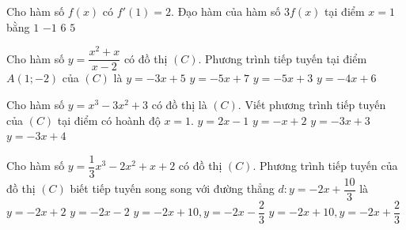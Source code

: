 \begin{ex}%
	Cho hàm số $f(x)$ có $f'(1)=2$. Đạo hàm của hàm số $3 f(x)$  tại điểm $x=1$ bằng
	\choice 
		{$1$} 
		 {$-1$}
		 {\True $6$}
		{$5$} 
\end{ex}

\begin{ex}%
	Cho hàm số $y =\dfrac{x^2 + x}{x - 2}$ có đồ thị $(C)$. Phương trình tiếp tuyến tại điểm $A(1; -2)$ của $(C)$  là
	\choice 
		{$y = -3x + 5$} 
		{$y  = -5x + 7$}
		{\True $y  = -5x + 3$}
		{$y = -4x  + 6$}
\end{ex}

\begin{ex}%
	Cho hàm số $y=x^3-3x^2+3$ có đồ thị là $(C)$. Viết phương  trình tiếp tuyến của $(C)$ tại điểm có hoành độ $x=1$.
	\choice 
		 {$y=2x-1$}
		{$y=-x+2$} 
		 {$y=-3x+3$}
		{\True  $y=-3x+4$}
\end{ex}

\begin{ex}%
	Cho hàm số $y=\dfrac {1}{3} x^3-2x^2+x+2$ có đồ thị  $(C)$. Phương trình tiếp tuyến của đồ thị $(C)$ biết tiếp tuyến song song với đường thẳng
	 $d\colon y=-2x+\dfrac {10}{3}$ là
	\choice 
		{\True $y=-2x+2$} 
		 {$y=-2x-2$}
		{$y=-2x+10, y=-2x-\dfrac  {2}{3}$}
		{$y=-2x+10,  y=-2x+\dfrac {2}{3}$}
\end{ex}

